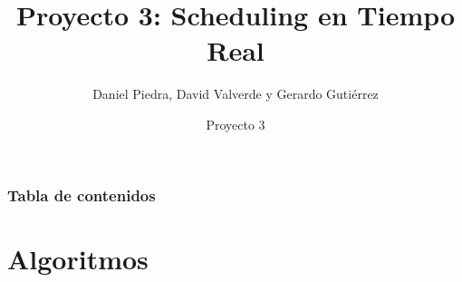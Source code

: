 \documentclass[xcolor=table]{beamer}
\title[Scheduling en Tiempo Real] %
{Proyecto 3: Scheduling en Tiempo Real}
\author[ Daniel Piedra, David Valverde, Gerardo Gutiérrez]
{Daniel Piedra, David Valverde y Gerardo Gutiérrez}
\date[Junio 2023] %
{Proyecto 3}
\begin{document}
\frame{\titlepage}


\begin{frame}
\frametitle{Tabla de contenidos}
\tableofcontents
\end{frame}


\section{Algoritmos}


\end{document}
